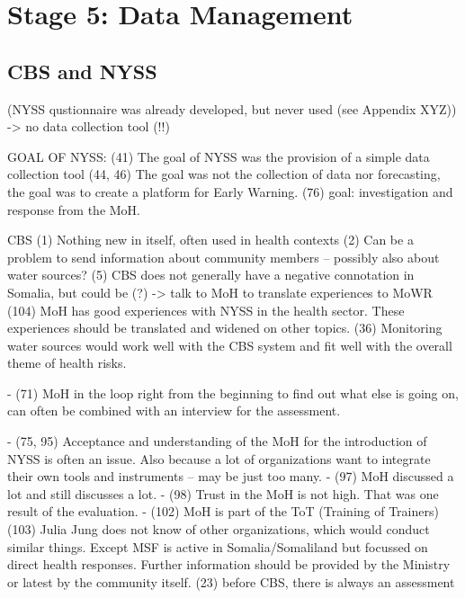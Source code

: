 \section{Stage 5: Data Management}


\subsection{CBS and NYSS} (NYSS qustionnaire was already developed, but never used (see Appendix XYZ))
-> no data collection tool (!!) 















GOAL OF NYSS:
(41) The goal of NYSS was the provision of a simple data collection tool
(44, 46) The goal was not the collection of data nor forecasting, the goal was to create a platform for Early Warning.
(76) goal: investigation and response from the MoH.

CBS
(1) Nothing new in itself, often used in health contexts
(2) Can be a problem to send information about community members – possibly also about water sources? 
(5) CBS does not generally have a negative connotation in Somalia, but could be (?) -> talk to MoH to translate experiences to MoWR
(104) MoH has good experiences with NYSS in the health sector. These experiences should be translated and widened on other topics.
(36) Monitoring water sources would work well with the CBS system and fit well with the overall theme of health risks.


-	(71) MoH in the loop right from the beginning to find out what else is going on, can often be combined with an interview for the assessment.


-	(75, 95) Acceptance and understanding of the MoH for the introduction of NYSS is often an issue. Also because a lot of organizations want to integrate their own tools and instruments – may be just too many.
-	(97) MoH discussed a lot and still discusses a lot.
-	(98) Trust in the MoH is not high. That was one result of the evaluation.
-	(102) MoH is part of the ToT (Training of Trainers)
(103) Julia Jung does not know of other organizations, which would conduct similar things. Except MSF is active in Somalia/Somaliland but focussed on direct health responses. Further information should be provided by the Ministry or latest by the community itself.
(23) before CBS, there is always an assessment

